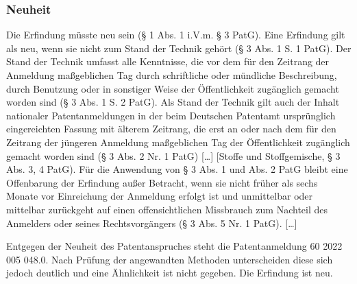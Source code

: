 \subsubsection{Neuheit}
Die Erfindung müsste neu sein (§ 1 Abs. 1 i.V.m. § 3 PatG).
Eine Erfindung gilt als neu, wenn sie nicht zum Stand der Technik gehört (§ 3 Abs. 1 S. 1 PatG). Der
Stand der Technik umfasst alle Kenntnisse, die vor dem für den Zeitrang der Anmeldung
maßgeblichen Tag durch schriftliche oder mündliche Beschreibung, durch Benutzung oder in
sonstiger Weise der Öffentlichkeit zugänglich gemacht worden sind (§ 3 Abs. 1 S. 2 PatG).
Als Stand der Technik gilt auch der Inhalt nationaler Patentanmeldungen in der beim Deutschen
Patentamt ursprünglich eingereichten Fassung mit älterem Zeitrang, die erst an oder nach dem für
den Zeitrang der jüngeren Anmeldung maßgeblichen Tag der Öffentlichkeit zugänglich gemacht
worden sind (§ 3 Abs. 2 Nr. 1 PatG) […] [Stoffe und Stoffgemische, § 3 Abs. 3, 4 PatG).
Für die Anwendung von § 3 Abs. 1 und Abs. 2 PatG bleibt eine Offenbarung der Erfindung außer
Betracht, wenn sie nicht früher als sechs Monate vor Einreichung der Anmeldung erfolgt ist und
unmittelbar oder mittelbar zurückgeht auf einen offensichtlichen Missbrauch zum Nachteil des
Anmelders oder seines Rechtsvorgängers (§ 3 Abs. 5 Nr. 1 PatG). […]

Entgegen der Neuheit des Patentanspruches steht die Patentanmeldung 60 2022 005 048.0.
Nach Prüfung der angewandten Methoden unterscheiden diese sich jedoch deutlich und eine Ähnlichkeit
ist nicht gegeben.
Die Erfindung ist neu.





